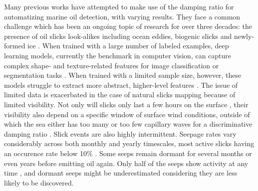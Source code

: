 \documentclass[journal]{IEEEtran}
\begin{document}
Many previous works have attempted to make use of the damping ratio for automatizing marine oil detection, with varying results. They face a common challenge which has been an ongoing topic of research for over 
three decades: the presence of oil slicks look-alikes including ocean eddies, biogenic slicks and newly-formed ice \cite{johanssonCanMineralOil2020,hovlandSlickDetectionSAR1994,alpersOilsSurfactants2004,
alpersOilSpillDetection2017,espedalSatelliteDetectionNatural1996}. 
When trained with a large number of labeled examples, deep learning models, currently the benchmark in computer vision, can capture complex shape- and texture-related features for image classification or 
segmentation tasks \cite{goodfellowDeepLearning2016}. When trained with a limited sample size, however, these models struggle to extract more abstract, higher-level features
\cite{bengioDeepLearningRepresentations2012}. The issue of limited data is exacerbated in the case of natural slicks mapping because of limited visibility. 
Not only will slicks only last a few hours on the surface \cite{jatiaultMonitoringNaturalOil2017,daneshgaraslHindcastModelingOil2017,oreillyDistributionMagnitudeVariability2022}, 
their visibility also depend on a specific window of surface wind conditions, outside of which the sea either has too many or too few capillary waves for a discriminative 
damping ratio \cite{quigleyInvestigationDampingRatio2023,sausDetectionDelineationProduced2021,gadeImagingBiogenicAnthropogenic1998}. 
\IEEEpubidadjcol  
Slick events are also highly intermittent. Seepage rates vary considerably across both monthly and yearly timescales, most active slicks having an occurence rate below 10\% 
\cite{jatiaultNaturalOilSeep2024,oreillyDistributionMagnitudeVariability2022}. Some seeps remain dormant for several months or even years before emitting oil again. Only half of the seeps show activity at any time 
\cite{jatiaultMonitoringNaturalOil2017,garcia-pinedaRemotesensingEvaluationGeophysical2010}, and dormant seeps might be underestimated considering they are less likely to be discovered.
\end{document}
